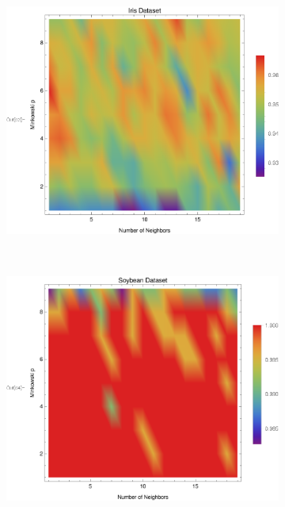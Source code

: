 \documentclass{article}
\begin{document}
\begin{figure}[h!]
			\begin{subfigure}[b]{0.32\textwidth}
				\centering
				\includegraphics[width=\textwidth]{figs/kNN/iris_plot_kp}	
				\caption{}
				\label{kp_iris}				
			\end{subfigure} \	
			\begin{subfigure}[b]{0.32\textwidth}
				\centering
				\includegraphics[width=\textwidth]{figs/kNN/soybean_plot_kp}	
				\caption{}
				\label{kp_soybean}				
			\end{subfigure} \	
			\begin{subfigure}[b]{0.32\textwidth}

\end{subfigure}
\end{figure}
\end{document}
